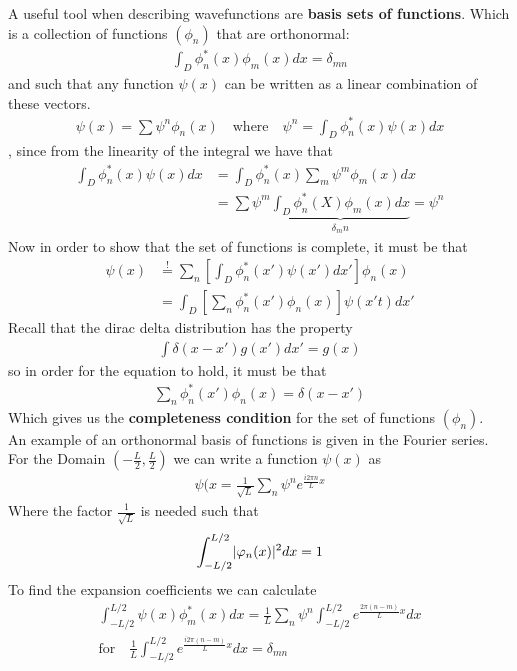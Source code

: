 A useful tool when describing wavefunctions are \textbf{basis sets of functions}. Which is a collection of functions $\left(\phi_{n}\right)$ that are orthonormal:
\begin{align*}
	\int_{D}\phi_n^*(x) \phi_m(x) dx = \delta_{mn}
\end{align*}
and such that any function $\psi(x)$ can be written as a linear combination of these vectors. 
\begin{align*}
	\psi(x) = \sum \psi^n \phi_n(x) \quad \text{where} \quad \psi^n = \int_{D} \phi_n^*(x) \psi(x) dx
\end{align*}
, since from the linearity of the integral we have that
\begin{align*}
	\int_{D}\phi_n^*(x) \psi(x) dx &= \int_D \phi_n^*(x) \sum_{m} \psi^m \phi_m(x) dx\\
																 &= \sum \psi^m \underbrace{\int_{D}\phi_n^*(X) \phi_m(x) dx}_{\delta_mn} = \psi^n
\end{align*}
Now in order to show that the set of functions is complete, it must be that
\begin{align*}
	\psi(x) &\stackrel{!}{=} \sum_{n} \left[\int_D \phi_n^*(x') \psi(x') dx'\right]\phi_n(x)\\
					&= \int_D \left[\sum_{n} \phi_n^*(x') \phi_n(x)\right] \psi(x't) dx'
\end{align*}
Recall that the dirac delta distribution has the property
\begin{align*}
	\int \delta(x - x') g(x') dx' = g(x)
\end{align*}
so in order for the equation to hold, it must be that
\begin{align*}
	\sum_n \phi_n^*(x') \phi_n(x) = \delta(x - x')
\end{align*}
Which gives us the \textbf{completeness condition} for the set of functions $\left(\phi_{n}\right)$.\\


An example of an orthonormal basis of functions is given in the  Fourier series. For the Domain $\left(- \frac{L}{2}, \frac{L}{2}\right)$ we can write a function $\psi(x)$ as
\begin{align*}
	\psi(x = \frac{1}{\sqrt{L}} \sum_{n} \psi^n e^{\frac{i2\pi n}{L}x}
\end{align*}
Where the factor $\frac{1}{\sqrt{L}}$ is needed such that
\begin{align*}
	\int_{-L/2}^{L/2} \abs{\phi_n(x)}^2 dx = 1
\end{align*}
To find the expansion coefficients we can calculate
\begin{align*}
	\int_{-L/2}^{L/2}\psi(x) \phi_m^*(x) dx = \frac{1}{L} \sum_{n} \psi^n \int_{-L/2}^{L/2}e^{\frac{2\pi (n-m)}{L}x}dx\\
	\text{for} \quad \frac{1}{L} \int_{-L/2}^{L/2} e^{\frac{i2\pi (n-m)}{L}x}dx = \delta_{mn}
\end{align*}

